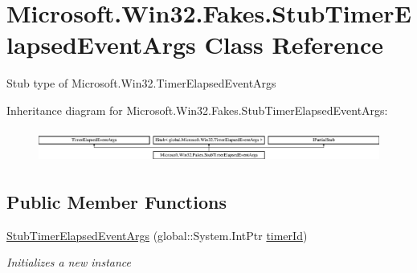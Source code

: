 \hypertarget{class_microsoft_1_1_win32_1_1_fakes_1_1_stub_timer_elapsed_event_args}{\section{Microsoft.\-Win32.\-Fakes.\-Stub\-Timer\-Elapsed\-Event\-Args Class Reference}
\label{class_microsoft_1_1_win32_1_1_fakes_1_1_stub_timer_elapsed_event_args}
}


Stub type of Microsoft.\-Win32.\-Timer\-Elapsed\-Event\-Args 


Inheritance diagram for Microsoft.\-Win32.\-Fakes.\-Stub\-Timer\-Elapsed\-Event\-Args\-:\begin{figure}[H]
\begin{center}
\leavevmode
\includegraphics[height=1.094819cm]{class_microsoft_1_1_win32_1_1_fakes_1_1_stub_timer_elapsed_event_args}
\end{center}
\end{figure}
\subsection*{Public Member Functions}
\begin{DoxyCompactItemize}
\item 
\hyperlink{class_microsoft_1_1_win32_1_1_fakes_1_1_stub_timer_elapsed_event_args_a78af4112d2159134f54191913cda952a}{Stub\-Timer\-Elapsed\-Event\-Args} (global\-::\-System.\-Int\-Ptr \hyperlink{jquery-1_810_82_8js_aa447439fbe7027e58837a297297c9d8a}{timer\-Id})
\begin{DoxyCompactList}\small\item\em Initializes a new instance\end{DoxyCompactList}\end{DoxyCompactItemize}
